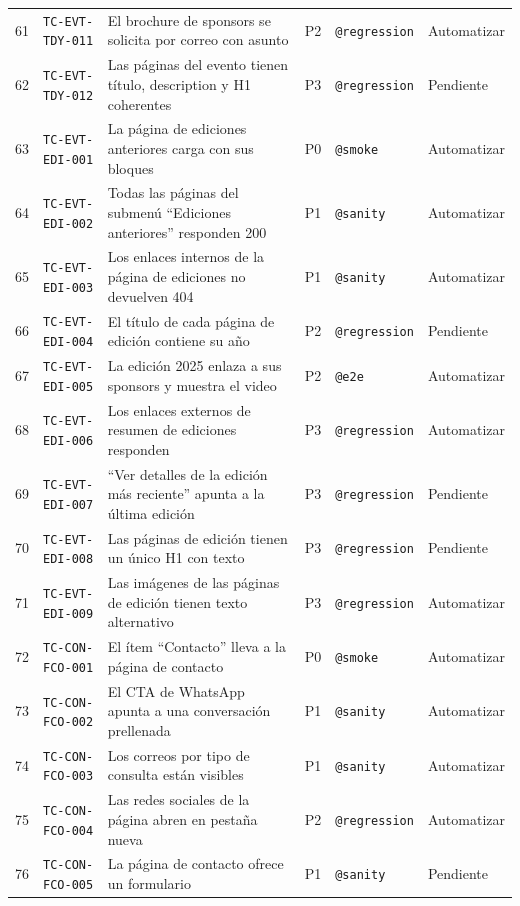 \documentclass[11pt,a4paper]{article}
\newcommand{\tcid}[1]{\texttt{#1}}
\begin{document}
{\begin{xltabular}{\textwidth}{@{}r l X c l l@{}}
61 & \tcid{TC-EVT-TDY-011} & El brochure de sponsors se solicita por correo con asunto & P2 & \texttt{@regression} & Automatizar \\
62 & \tcid{TC-EVT-TDY-012} & Las páginas del evento tienen título, description y H1 coherentes & P3 & \texttt{@regression} & Pendiente \\
63 & \tcid{TC-EVT-EDI-001} & La página de ediciones anteriores carga con sus bloques & P0 & \texttt{@smoke} & Automatizar \\
64 & \tcid{TC-EVT-EDI-002} & Todas las páginas del submenú ``Ediciones anteriores'' responden 200 & P1 & \texttt{@sanity} & Automatizar \\
65 & \tcid{TC-EVT-EDI-003} & Los enlaces internos de la página de ediciones no devuelven 404 & P1 & \texttt{@sanity} & Automatizar \\
66 & \tcid{TC-EVT-EDI-004} & El título de cada página de edición contiene su año & P2 & \texttt{@regression} & Pendiente \\
67 & \tcid{TC-EVT-EDI-005} & La edición 2025 enlaza a sus sponsors y muestra el video & P2 & \texttt{@e2e} & Automatizar \\
68 & \tcid{TC-EVT-EDI-006} & Los enlaces externos de resumen de ediciones responden & P3 & \texttt{@regression} & Automatizar \\
69 & \tcid{TC-EVT-EDI-007} & ``Ver detalles de la edición más reciente'' apunta a la última edición & P3 & \texttt{@regression} & Pendiente \\
70 & \tcid{TC-EVT-EDI-008} & Las páginas de edición tienen un único H1 con texto & P3 & \texttt{@regression} & Pendiente \\
71 & \tcid{TC-EVT-EDI-009} & Las imágenes de las páginas de edición tienen texto alternativo & P3 & \texttt{@regression} & Automatizar \\
72 & \tcid{TC-CON-FCO-001} & El ítem ``Contacto'' lleva a la página de contacto & P0 & \texttt{@smoke} & Automatizar \\
73 & \tcid{TC-CON-FCO-002} & El CTA de WhatsApp apunta a una conversación prellenada & P1 & \texttt{@sanity} & Automatizar \\
74 & \tcid{TC-CON-FCO-003} & Los correos por tipo de consulta están visibles & P1 & \texttt{@sanity} & Automatizar \\
75 & \tcid{TC-CON-FCO-004} & Las redes sociales de la página abren en pestaña nueva & P2 & \texttt{@regression} & Automatizar \\
76 & \tcid{TC-CON-FCO-005} & La página de contacto ofrece un formulario & P1 & \texttt{@sanity} & Pendiente \\

\end{xltabular}}
\end{document}
